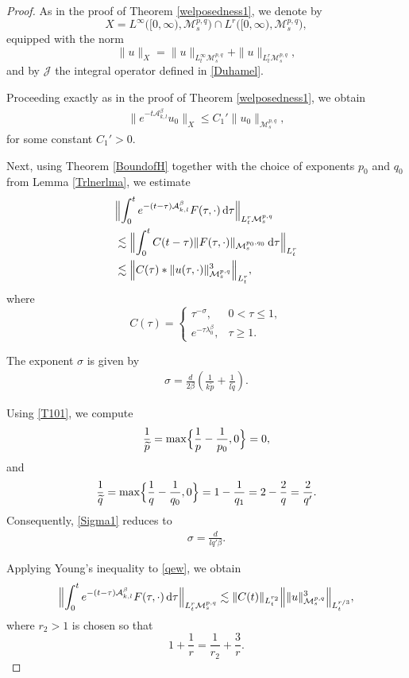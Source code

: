 \documentclass[10pt,a4paper]{amsart}
\def \Ad{\mathcal{A}_{k,l}}
\def\M{\mathcal{M}}
\begin{document}
\begin{proof}
As in the proof of Theorem \ref{welposedness1}, we denote by
\[
X
=
L^{\infty}\bigl([0,\infty),\M^{p,q}_{s}\bigr)
\cap
L^{r}\bigl([0,\infty),\M^{p,q}_{s}\bigr),
\]
equipped with the norm
\[
\|u\|_{X}
=
\|u\|_{L^{\infty}_{t}\M^{p,q}_{s}}
+
\|u\|_{L^{r}_{t}\M^{p,q}_{s}},
\]
and by $\mathcal{J}$ the integral operator defined in
\eqref{Duhamel}.

Proceeding exactly as in the proof of Theorem
\ref{welposedness1}, we obtain
\begin{align}
\label{awk}
\|e^{-t\Ad^{\beta}}u_{0}\|_{X}
\leq
C_{1}'\|u_{0}\|_{\M^{p,q}_{s}},
\end{align}
for some constant $C_{1}'>0$.

Next, using Theorem \ref{BoundofH} together with the choice of
exponents $p_{0}$ and $q_{0}$ from Lemma \ref{Trlnerlma}, we estimate
\begin{align}
\label{qew}
&
\Bigl\|
\int_{0}^{t}
e^{-(t-\tau)\Ad^{\beta}}
F(\tau,\cdot)\,\mathrm{d}\tau
\Bigr\|_{L^{r}_{t}\M^{p,q}_{s}}
\nonumber\\
&\lesssim
\Bigl\|
\int_{0}^{t}
C(t-\tau)
\|F(\tau,\cdot)\|_{\M^{p_{0},q_{0}}_{s}}
\,\mathrm{d}\tau
\Bigr\|_{L^{r}_{t}}
\nonumber\\
&\lesssim
\Bigl\|
C(\tau)
*
\|u(\tau,\cdot)\|_{\M^{p,q}_{s}}^{3}
\Bigr\|_{L^{r}_{t}},
\end{align}
where
\[
C(\tau)
=
\begin{cases}
\tau^{-\sigma},
& 0<\tau\leq 1,
\\[0.3em]
e^{-\tau\lambda_{0}^{\beta}},
& \tau\geq 1.
\end{cases}
\]

The exponent $\sigma$ is given by
\begin{align}
\label{Sigma1}
\sigma
=
\frac{d}{2\beta}
\left(
\frac{1}{k\widetilde{p}}
+
\frac{1}{l\widetilde{q}}
\right).
\end{align}

Using \eqref{T101}, we compute
\[
\frac{1}{\widetilde{p}}
=
\max\Bigl\{
\frac{1}{p}-\frac{1}{p_{0}},
0
\Bigr\}
=
0,
\]
and
\[
\frac{1}{\widetilde{q}}
=
\max\Bigl\{
\frac{1}{q}-\frac{1}{q_{0}},
0
\Bigr\}
=
1-\frac{1}{q_{1}}
=
2-\frac{2}{q}
=
\frac{2}{q'}.
\]
Consequently, \eqref{Sigma1} reduces to
\begin{align}
\label{sigma2}
\sigma
=
\frac{d}{lq'\beta}.
\end{align}

Applying Young's inequality to \eqref{qew}, we obtain
\begin{align}
\label{qwee}
\Bigl\|
\int_{0}^{t}
e^{-(t-\tau)\Ad^{\beta}}
F(\tau,\cdot)\,\mathrm{d}\tau
\Bigr\|_{L^{r}_{t}\M^{p,q}_{s}}
\lesssim
\|C(t)\|_{L^{r_{2}}_{t}}
\Bigl\|
\|u\|_{\M^{p,q}_{s}}^{3}
\Bigr\|_{L^{r/3}_{t}},
\end{align}
where $r_{2}>1$ is chosen so that
\[
1+\frac{1}{r}
=
\frac{1}{r_{2}}
+
\frac{3}{r}.
\]


\end{proof}
\end{document}
